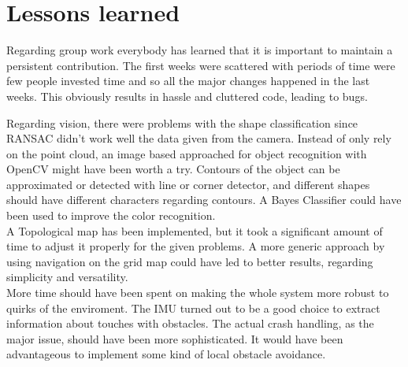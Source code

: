 \section{Lessons learned}

Regarding group work everybody has learned that it is important to maintain a persistent contribution.
The first weeks were scattered with periods of time were few people invested time and so all the major changes happened in the last weeks.
This obviously results in hassle and cluttered code, leading to bugs.

Regarding vision, there were problems with the shape classification since RANSAC didn't work well the data given from the camera. 
Instead of only rely on the point cloud, an image based approached for object recognition with OpenCV might have been worth a try. 
Contours of the object can be approximated or detected with line or corner detector, and different shapes should have different characters regarding contours.
A Bayes Classifier could have been used to improve the color recognition.\\

\setlength{\parindent}{0pt}A Topological map has been implemented, but it took a significant amount of time to adjust it properly for the given problems.
A more generic approach by using navigation on the grid map could have led to better results, regarding simplicity and versatility.\\

\setlength{\parindent}{0pt}More time should have been spent on making the whole system more robust to quirks of the enviroment.
The IMU turned out to be a good choice to extract information about touches with obstacles.
The actual crash handling, as the major issue, should have been more sophisticated.
It would have been advantageous to implement some kind of local obstacle avoidance.
